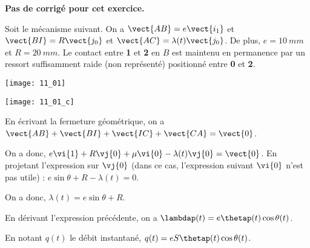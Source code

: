 \normalfalse \difficiletrue \tdifficilefalse
\correctiontrue


\setcounter{numques}{0}
\ifcorrection
\else
\textbf{Pas de corrigé pour cet exercice.}
\fi

\ifprof
\else
Soit le mécanisme suivant. On a $\vect{AB}=e\vect{i_1}$ et $\vect{BI}=R\vect{j_0}$ et $\vect{AC}=\lambda(t)\vect{j_0}$. De plus, 
$e=\SI{10}{mm}$ et $R=\SI{20}{mm}$. Le contact entre \textbf{1} et \textbf{2} en $B$ est maintenu en permanence par un ressort suffisamment raide (non représenté) positionné entre \textbf{0} et \textbf{2}. 
\begin{center}
\texttt{[image: 11\_01]}
\end{center}
\fi


\ifprof
\begin{center}
\texttt{[image: 11\_01\_c]}
\end{center}

\else
\fi


\ifprof

En écrivant la fermeture géométrique, on a $\vect{AB}+\vect{BI}+\vect{IC}+\vect{CA}=\vect{0}$.

On a donc, $e\vi{1}+R\vj{0}+\mu\vi{0}-\lambda(t)\vj{0}=\vect{0}$. En projetant l'expression sur $\vj{0}$ (dans ce cas, l'expression suivant $\vi{0}$ n'est pas utile) :
$ e\sin\theta +R - \lambda(t)=0$.

On a donc, $\lambda(t)=e\sin\theta +R $.
\else
\fi

\ifprof

En dérivant l'expression précédente, on a $\lambdap (t)=e\thetap(t) \cos\theta (t) $.
\else
\fi

\ifprof

En notant $q(t)$ le débit instantané, $q(t)=eS\thetap(t) \cos\theta (t)$.
\else
\fi

\ifprof

